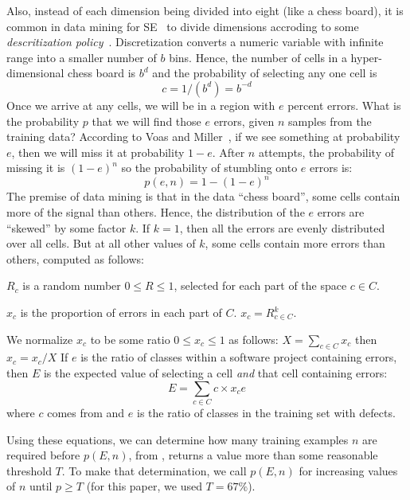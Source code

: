 Also,
instead of each dimension being divided into eight (like a chess board), it is common in data mining for SE~\cite{Menzies2014a}
to divide dimensions accroding to some {\em descritization policy}~\cite{lust08}.
Discretization converts a numeric variable with infinite range into a smaller number of  $b$ bins. Hence, the number of cells in a
hyper-dimensional chess board is $b^d$ and the probability of selecting any one cell is
\begin{equation}\label{eq:c}c=1/(b^d)=b^{-d}\end{equation}
Once we arrive at any cells, we will be in a region with $e$ percent errors.
What  is the probability $p$ that we will find those $e$ errors, given $n$ samples from the training data?
According to Voas and Miller~\cite{voas1995software},
if we see something at probability $e$, then we will miss it at probability $1-e$.
After $n$ attempts, the probability of missing it is $(1-e)^n$ so the probability of stumbling onto $e$ errors is:
\begin{equation}\label{eq:p}
p(e,n) = 1-(1-e)^n
\end{equation}
The premise of data mining is that in the data ``chess board'', some cells contain more of the signal than others. Hence, the 
distribution of the $e$ errors are ``skewed'' by some factor $k$. If $k=1$, then all the errors are evenly distributed over all cells.
But at all other values of $k$, some cells contain more errors than others, computed as follows:
    \bi
  \item $R_c$ is a random number $0\le R \le 1$, selected for each part of the space $c\in C$.
  \item $x_c$ is the proportion of errors in each part of $C$. \mbox{$x_c =  R_{c\in C}^k$}.
  \item We normalize $x_c$ to be some ratio $0 \le x_c \le 1$ as follows: $X= \sum_{c\in C} x_c$ then $x_c = x_c/X$
    \ei
    If  $e$ is the ratio of classes within a software project containing errors, then $E$ 
    is the expected value  of selecting a cell {\em and} that cell containing errors:
    \begin{equation}\label{eq:E}
     E   = \sum_{c\in C}c \times x_ce
    \end{equation}
    where $c$ comes from  and $e$ is the ratio of classes in the training set with defects.


Using these equations, we can determine how many
training examples $n$ are required before $p(E,n)$, from 
, returns a value more than some reasonable
threshold $T$.  To make that determination, we call
$p(E,n)$ for increasing values of $n$ until $p \ge
T$ (for this paper, we used $T = 67\%$).

